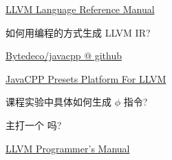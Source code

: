 
\begin{frame}{}
	\begin{center}
		\href{https://llvm.org/docs/LangRef.html}{LLVM Language Reference Manual}

		\vspace{0.50cm}
		如何用编程的方式生成 LLVM IR?
	\end{center}
\end{frame}

\begin{frame}{}
	\begin{center}
		\href{https://github.com/bytedeco/javacpp}{Bytedeco/javacpp @ github}

		\vspace{0.30cm}
		\href{https://mvnrepository.com/artifact/org.bytedeco/llvm-platform/15.0.3-1.5.8}{JavaCPP Presets Platform For LLVM}

		\vspace{0.50cm}
	\end{center}
\end{frame}

\begin{frame}{}
	\begin{center}
		课程实验中具体如何生成 $\phi$ 指令?

		\vspace{0.30cm}
		\vspace{0.30cm}

		主打一个 吗?
	\end{center}
\end{frame}

\begin{frame}{}
\end{frame}

\begin{frame}{}
	\begin{center}
		\href{https://llvm.org/docs/ProgrammersManual.html}{LLVM Programmer's Manual}

		\vspace{0.30cm}
	\end{center}
\end{frame}


